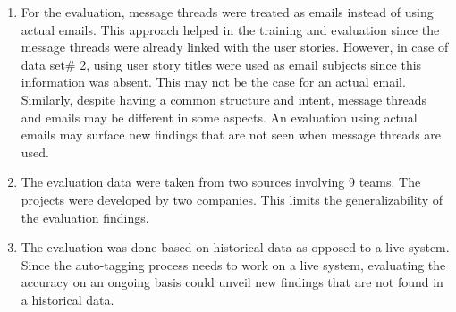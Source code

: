 \begin{enumerate}
	\item For the evaluation, message threads were treated as emails instead of using actual emails. This approach helped in the training and evaluation since the message threads were already linked with the user stories. However, in case of data set\# 2, using user story titles were used as email subjects since this information was absent. This may not be the case for an actual email. Similarly, despite having a common structure and intent, message threads and emails may be different in some aspects. An evaluation using actual emails may surface new findings that are not seen when message threads are used.

	\item The evaluation data were taken from two sources involving 9 teams. The projects were developed by two companies. This limits the generalizability of the evaluation findings.
	
	\item The evaluation was done based on historical data as opposed to a live system. Since the auto-tagging process needs to work on a live system, evaluating the accuracy on an ongoing basis could unveil new findings that are not found in a historical data. 
	
\end{enumerate}


	
